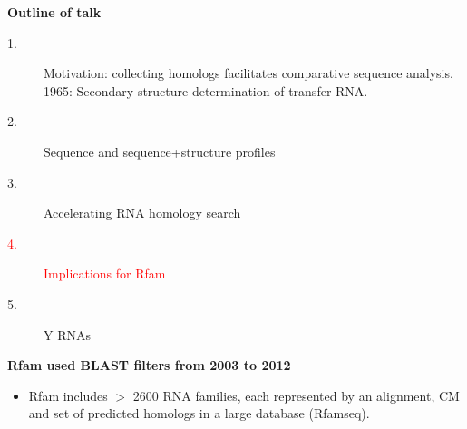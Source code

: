 \documentclass[landscape]{slides}
\begin{document}
\begin{slide}
\begin{center}
\textbf{Outline of talk}

\begin{description}
\item[1.] Motivation: collecting homologs facilitates comparative
  sequence analysis.\\ 1965: Secondary structure determination of
  transfer RNA.
\item[2.] Sequence and sequence+structure profiles
\item[3.] Accelerating RNA homology search
\item[\textcolor{red}{4.}] \textcolor{red}{Implications for Rfam}
\item[5.] Y RNAs
\end{description}

\end{center}
\vfill
\end{slide}
\begin{slide}
\begin{center}

\textbf{Rfam used BLAST filters from 2003 to 2012}

\end{center}

\begin{itemize}
\item Rfam includes $>$ 2600 RNA families, each represented by an
  alignment, CM and set of predicted homologs in a large database (Rfamseq).
\end{itemize}


\vfill
\end{slide}
\end{document}
